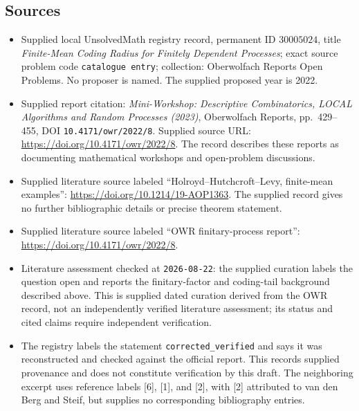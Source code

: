 \documentclass[11pt]{article}
\begin{document}
\subsection{Sources}
\begin{itemize}
\item Supplied local UnsolvedMath registry record, permanent ID \(30005024\), title \emph{Finite-Mean Coding Radius for Finitely Dependent Processes}; exact source problem code \texttt{catalogue entry}; collection: Oberwolfach Reports Open Problems. No proposer is named. The supplied proposed year is 2022.
\item Supplied report citation: \emph{Mini-Workshop: Descriptive Combinatorics, LOCAL Algorithms and Random Processes (2023)}, Oberwolfach Reports, pp.\ 429--455, DOI \texttt{10.4171/owr/2022/8}. Supplied source URL: \url{https://doi.org/10.4171/owr/2022/8}. The record describes these reports as documenting mathematical workshops and open-problem discussions.
\item Supplied literature source labeled ``Holroyd--Hutchcroft--Levy, finite-mean examples'': \url{https://doi.org/10.1214/19-AOP1363}. The supplied record gives no further bibliographic details or precise theorem statement.
\item Supplied literature source labeled ``OWR finitary-process report'': \url{https://doi.org/10.4171/owr/2022/8}.
\item Literature assessment checked at \texttt{2026-08-22}: the supplied curation labels the question open and reports the finitary-factor and coding-tail background described above. This is supplied dated curation derived from the OWR record, not an independently verified literature assessment; its status and cited claims require independent verification.
\item The registry labels the statement \texttt{corrected\_verified} and says it was reconstructed and checked against the official report. This records supplied provenance and does not constitute verification by this draft. The neighboring excerpt uses reference labels [6], [1], and [2], with [2] attributed to van den Berg and Steif, but supplies no corresponding bibliography entries.
\end{itemize}
\end{document}
